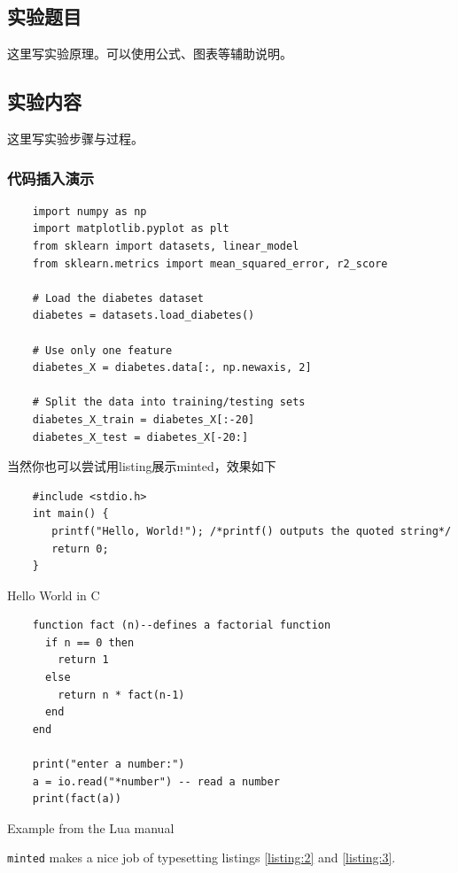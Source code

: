 \documentclass[a4paper,12pt]{ctexart}
\begin{document}
\subsection{实验题目}
这里写实验原理。可以使用公式、图表等辅助说明。

\subsection{实验内容}
这里写实验步骤与过程。
\subsubsection{代码插入演示}

\begin{verbatim}
    import numpy as np
    import matplotlib.pyplot as plt
    from sklearn import datasets, linear_model
    from sklearn.metrics import mean_squared_error, r2_score

    # Load the diabetes dataset
    diabetes = datasets.load_diabetes()

    # Use only one feature
    diabetes_X = diabetes.data[:, np.newaxis, 2]

    # Split the data into training/testing sets
    diabetes_X_train = diabetes_X[:-20]
    diabetes_X_test = diabetes_X[-20:]
\end{verbatim}

当然你也可以尝试用listing展示minted，效果如下
\begin{listing}[!ht]
    \begin{verbatim}
    #include <stdio.h>
    int main() {
       printf("Hello, World!"); /*printf() outputs the quoted string*/
       return 0;
    }
    \end{verbatim}
    \caption{Hello World in C}
    \label{listing:2}
\end{listing}

\begin{listing}[!ht]
    \begin{verbatim}
    function fact (n)--defines a factorial function
      if n == 0 then
        return 1
      else
        return n * fact(n-1)
      end
    end
    
    print("enter a number:")
    a = io.read("*number") -- read a number
    print(fact(a))
    \end{verbatim}
    \caption{Example from the Lua manual}
    \label{listing:3}
\end{listing}
\noindent\texttt{minted} makes a nice job of typesetting listings \ref{listing:2} and \ref{listing:3}.
\end{document}
